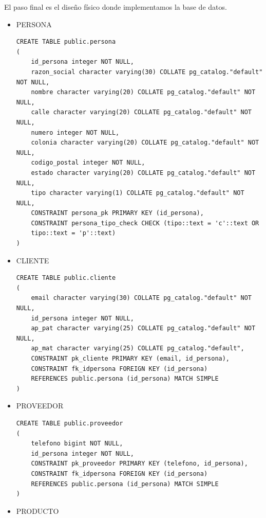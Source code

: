 \documentclass{article}
\begin{document}
El paso final es el diseño físico donde implementamos la base de datos. \\

\begin{itemize}
\item PERSONA\\

\begin{lstlisting}
CREATE TABLE public.persona 
( 
	id_persona integer NOT NULL, 
	razon_social character varying(30) COLLATE pg_catalog."default" NOT NULL, 
	nombre character varying(20) COLLATE pg_catalog."default" NOT NULL, 
	calle character varying(20) COLLATE pg_catalog."default" NOT NULL, 
	numero integer NOT NULL, 
	colonia character varying(20) COLLATE pg_catalog."default" NOT NULL, 
	codigo_postal integer NOT NULL, 
	estado character varying(20) COLLATE pg_catalog."default" NOT NULL, 
	tipo character varying(1) COLLATE pg_catalog."default" NOT NULL, 
	CONSTRAINT persona_pk PRIMARY KEY (id_persona), 
	CONSTRAINT persona_tipo_check CHECK (tipo::text = 'c'::text OR
	tipo::text = 'p'::text) 
)
\end{lstlisting}

\item CLIENTE \\

\begin{lstlisting}
CREATE TABLE public.cliente 
( 
	email character varying(30) COLLATE pg_catalog."default" NOT NULL, 
	id_persona integer NOT NULL, 
	ap_pat character varying(25) COLLATE pg_catalog."default" NOT NULL, 
	ap_mat character varying(25) COLLATE pg_catalog."default", 
	CONSTRAINT pk_cliente PRIMARY KEY (email, id_persona), 
	CONSTRAINT fk_idpersona FOREIGN KEY (id_persona) 
	REFERENCES public.persona (id_persona) MATCH SIMPLE 
) 
\end{lstlisting}
 
\item PROVEEDOR \\

\begin{lstlisting}
CREATE TABLE public.proveedor 
( 
	telefono bigint NOT NULL, 
	id_persona integer NOT NULL, 
	CONSTRAINT pk_proveedor PRIMARY KEY (telefono, id_persona), 
	CONSTRAINT fk_idpersona FOREIGN KEY (id_persona) 
	REFERENCES public.persona (id_persona) MATCH SIMPLE 
) 
\end{lstlisting}

\item PRODUCTO \\


\end{itemize}
\end{document}
